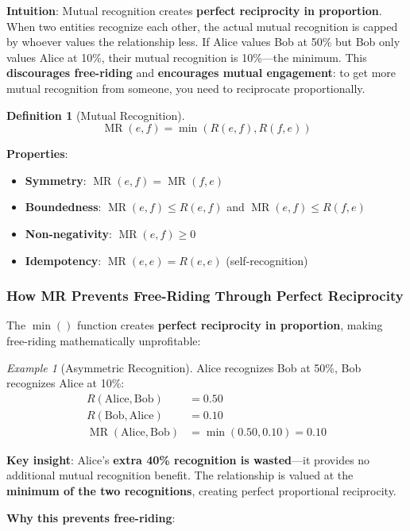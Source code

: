 \documentclass[11pt,a4paper]{article}
\theoremstyle{definition}
\newtheorem{definition}[theorem]{Definition}
\theoremstyle{remark}
\newtheorem{example}[theorem]{Example}
\DeclareMathOperator{\MR}{MR}
\begin{document}
\textbf{Intuition}: Mutual recognition creates \textbf{perfect reciprocity in proportion}. When two entities recognize each other, the actual mutual recognition is capped by whoever values the relationship less. If Alice values Bob at 50\% but Bob only values Alice at 10\%, their mutual recognition is 10\%---the minimum. This \textbf{discourages free-riding} and \textbf{encourages mutual engagement}: to get more mutual recognition from someone, you need to reciprocate proportionally.

\begin{definition}[Mutual Recognition]
\[ \MR(e,f) = \min(R(e,f), R(f,e)) \]
\end{definition}

\textbf{Properties}:
\begin{itemize}
\item \textbf{Symmetry}: $\MR(e,f) = \MR(f,e)$
\item \textbf{Boundedness}: $\MR(e,f) \le R(e,f)$ and $\MR(e,f) \le R(f,e)$
\item \textbf{Non-negativity}: $\MR(e,f) \ge 0$
\item \textbf{Idempotency}: $\MR(e,e) = R(e,e)$ (self-recognition)
\end{itemize}

\subsubsection{How MR Prevents Free-Riding Through Perfect Reciprocity}

The $\min()$ function creates \textbf{perfect reciprocity in proportion}, making free-riding mathematically unprofitable:

\begin{example}[Asymmetric Recognition]
Alice recognizes Bob at 50\%, Bob recognizes Alice at 10\%:
\begin{align*}
R(\text{Alice}, \text{Bob}) &= 0.50 \\
R(\text{Bob}, \text{Alice}) &= 0.10 \\
\MR(\text{Alice}, \text{Bob}) &= \min(0.50, 0.10) = 0.10
\end{align*}

\textbf{Key insight}: Alice's \textbf{extra 40\% recognition is wasted}---it provides no additional mutual recognition benefit. The relationship is valued at the \textbf{minimum of the two recognitions}, creating perfect proportional reciprocity.
\end{example}

\textbf{Why this prevents free-riding}:
\end{document}
